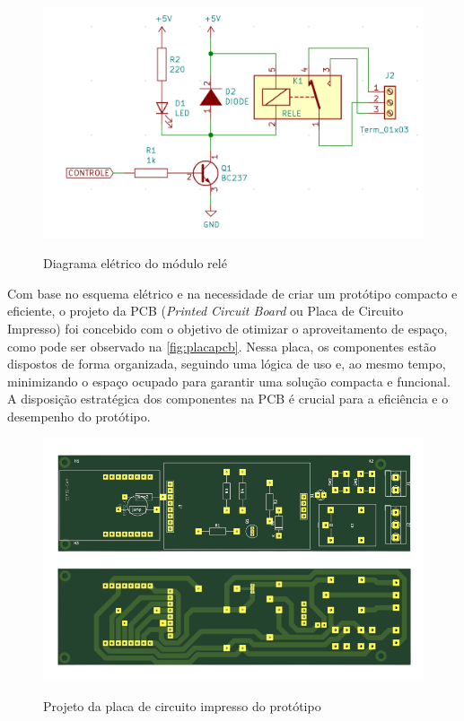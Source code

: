 \begin{figure}[h!]
    \centering
    \caption{Diagrama elétrico do módulo relé}
    \includegraphics[scale=0.2]{figuras/modulo_rele_esquema.png}
    \fonte{}%
    \label{fig:diagramarele}
    \centering
\end{figure}

Com base no esquema elétrico e na necessidade de criar um protótipo 
compacto e eficiente, o projeto da PCB (\textit{Printed Circuit Board} ou 
Placa de Circuito Impresso) foi concebido com o objetivo de otimizar 
o aproveitamento de espaço, como pode ser observado na \autoref{fig:placapcb}. 
Nessa placa, os componentes estão dispostos de forma organizada, 
seguindo uma lógica de uso e, ao mesmo tempo, minimizando o espaço 
ocupado para garantir uma solução compacta e funcional. A disposição 
estratégica dos componentes na PCB é crucial para a eficiência e o 
desempenho do protótipo.

\begin{figure}[h!]
    \centering
    \caption{Projeto da placa de circuito impresso do protótipo}
    \includegraphics[scale=0.25]{figuras/placa_pcb.png}
    \fonte{}%
    \label{fig:placapcb}
    \centering
\end{figure}

